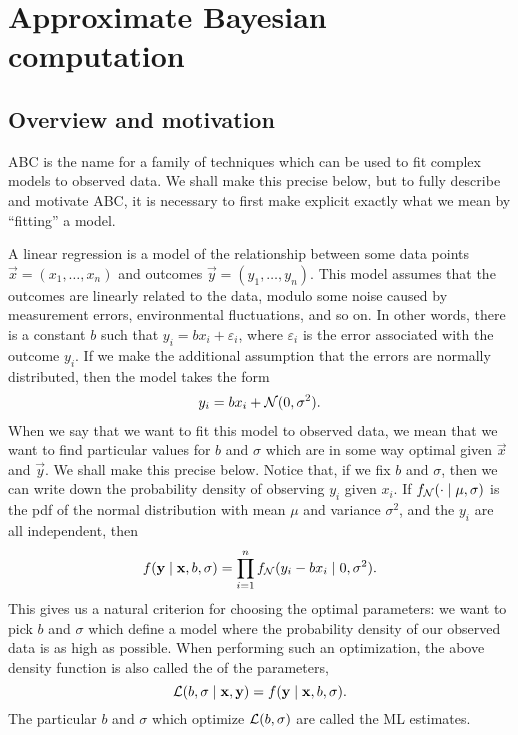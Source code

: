 \section{Approximate Bayesian computation}

\subsection{Overview and motivation}

\gls{ABC} is the name for a family of techniques which can be used to fit
complex models to observed data. We shall make this precise below, but to fully
describe and motivate \gls{ABC}, it is necessary to first make explicit exactly
what we mean by ``fitting'' a model. 

A linear regression is a model of the relationship between some data points
$\vec{x} = (x_1, \ldots, x_n)$ and outcomes $\vec{y} = (y_1, \ldots, y_n)$.
This model assumes that the outcomes are linearly related to the data, modulo
some noise caused by measurement errors, environmental fluctuations, and so on.
In other words, there is a constant $b$ such that $y_i = bx_i + \varepsilon_i$,
where $\varepsilon_i$ is the error associated with the outcome $y_i$. If we
make the additional assumption that the errors are normally distributed, then
the model takes the form
\begin{align}
  y_i = bx_i + \mathcal{N}(0, \sigma^2).
  \label{eq:regression}
\end{align}
When we say that we want to fit this model to observed data, we mean that we
want to find particular values for $b$ and $\sigma$ which are in some way
optimal given $\vec{x}$ and $\vec{y}$. We shall make this precise below. Notice
that, if we fix $b$ and $\sigma$, then we can write down the probability density
of observing $y_i$ given $x_i$. If $f_{\mathcal{N}}(\cdot \mid \mu, \sigma)$ is the
\gls{pdf} of the normal distribution with mean $\mu$ and variance $\sigma^2$,
and the $y_i$ are all independent, then
\[
  f(\mathbf{y} \mid \mathbf{x}, b, \sigma) = 
  \prod_{i=1}^n f_{\mathcal{N}}(y_i - bx_i \mid 0, \sigma^2).
\]
This gives us a natural criterion for choosing the optimal parameters: we want
to pick $b$ and $\sigma$ which define a model where the probability density of
our observed data is as high as possible. When performing such an optimization,
the above density function is also called the  of the
parameters,
\[
  \mathcal{L}(b, \sigma \mid \mathbf{x}, \mathbf{y}) = f(\mathbf{y} \mid \mathbf{x}, b, \sigma).
\]
The particular $b$ and $\sigma$ which optimize $\mathcal{L}(b, \sigma)$ are called the
\gls{ML} estimates.

